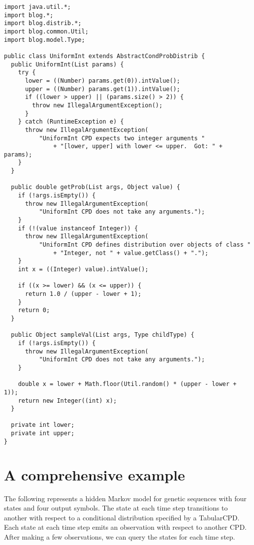 \documentclass[12pt]{article}
\begin{document}
\begin{verbatim}
import java.util.*;
import blog.*;
import blog.distrib.*;
import blog.common.Util;
import blog.model.Type;

public class UniformInt extends AbstractCondProbDistrib {
  public UniformInt(List params) {
    try {
      lower = ((Number) params.get(0)).intValue();
      upper = ((Number) params.get(1)).intValue();
      if ((lower > upper) || (params.size() > 2)) {
        throw new IllegalArgumentException();
      }
    } catch (RuntimeException e) {
      throw new IllegalArgumentException(
          "UniformInt CPD expects two integer arguments "
              + "[lower, upper] with lower <= upper.  Got: " + params);
    }
  }

  public double getProb(List args, Object value) {
    if (!args.isEmpty()) {
      throw new IllegalArgumentException(
          "UniformInt CPD does not take any arguments.");
    }
    if (!(value instanceof Integer)) {
      throw new IllegalArgumentException(
          "UniformInt CPD defines distribution over objects of class "
              + "Integer, not " + value.getClass() + ".");
    }
    int x = ((Integer) value).intValue();

    if ((x >= lower) && (x <= upper)) {
      return 1.0 / (upper - lower + 1);
    }
    return 0;
  }

  public Object sampleVal(List args, Type childType) {
    if (!args.isEmpty()) {
      throw new IllegalArgumentException(
          "UniformInt CPD does not take any arguments.");
    }

    double x = lower + Math.floor(Util.random() * (upper - lower + 1));
    return new Integer((int) x);
  }

  private int lower;
  private int upper;
}
\end{verbatim}


\section{A comprehensive example}
\begin{example}
The following represents a hidden Markov model for genetic sequences with four states and four output symbols. The state at each time step transitions to another with respect to a conditional distribution specified by a TabularCPD. 
Each state at each time step emits an observation with respect to another CPD. After making a few observations, we can query the states for each time step.
\end{example}
\end{document}
